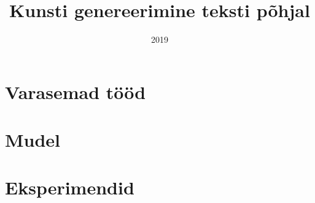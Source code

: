 \documentclass{vilgym}
\title{Kunsti genereerimine teksti põhjal}
\date{2019}
\begin{document}
    \maketitle
    \tableofcontents

    
    \section{Varasemad tööd}

    \section{Mudel}

    \section{Eksperimendid}


\end{document}
